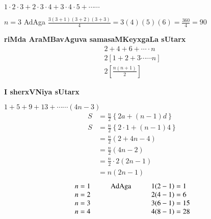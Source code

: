 $1 \cdot 2 \cdot 3 +2 \cdot 3 \cdot 4+ 3 \cdot 4 \cdot 5 +\cdots\cdots $

\medskip
$n=3$ AdAga $\frac{3(3+1)(3+2)(3+3)}{4} = 3(4)(5)(6)=\frac{360}{4}=90$

\textbf{ riMda AraMBavAguva samasaMKeyxgaLa sUtarx}
\begin{gather*}
2+4+6+ \cdots\cdot n\\
2[1+2+3\cdots\cdots n]\\
2\left[\frac{n(n+1)}{2}\right]
\end{gather*}

\textbf{I sherxVNiya sUtarx}

$1+5+9+13+ \cdots\cdots (4n-3)$
\begin{align*}
S &=\frac{n}{2}\left\{2a+(n-1)d\right\}\\
S &=\frac{n}{2}\left\{2\cdot 1 +(n-1)4\right\}\\
  &=\frac{n}{2}\left( 2 +4n-4\right)\\
  &=\frac{n}{2}(4n-2)\\
  &=\frac{n}{2}\cdot 2(2n -1)\\
  &=n(2n-1)
\end{align*}
$$
\begin{array}{c@{\hspace{1cm}}c@{\hspace{1cm}}l}
n=1 & \text{AdAga} & 1(2-1)=1\\
n=2 &              & 2(4-1)=6\\
n=3 &              & 3(6-1)=15\\
n=4 &              & 4(8-1)=28
\end{array}
$$
